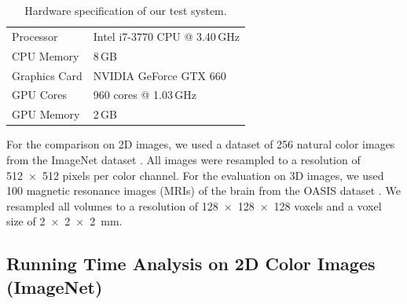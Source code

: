 \begin{table} 
\centering
\caption{Hardware specification of our test system.}
\vspace{1em}
\label{tab:hardware}
\begin{tabular} {ll}
\toprule
Processor & Intel i7-3770 CPU @ 3.40\,GHz \\
CPU Memory & 8\,GB \\
\addlinespace
Graphics Card & NVIDIA GeForce GTX 660 \\
GPU Cores & 960 cores @ 1.03\,GHz \\
GPU Memory & 2\,GB \\
\bottomrule
\end{tabular}
\end{table}

For the comparison on 2D images, we used a dataset of 256 natural color images
from the ImageNet dataset \citep{deng2009}. All images were resampled to a resolution
of \num{512x512} pixels per color channel. For the evaluation on 3D images, we
used 100 magnetic resonance images (MRIs) of the brain from the OASIS dataset
\citep{Marcus2007}. We resampled all volumes to a resolution of
\num{128x128x128} voxels and a voxel size of \SI{2x2x2}{\milli\metre}.

\subsection{Running Time Analysis on 2D Color Images (ImageNet)}

